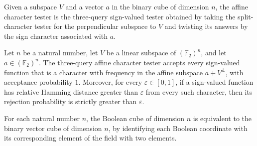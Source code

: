 \begin{definition}
\label{FABL.affineCharacterFunctionTester}
\leanok
{}
Given a subspace $V$ and a vector $a$ in the binary cube of dimension $n$, the affine
character tester is the three-query sign-valued tester obtained by taking the
split-character tester for the perpendicular subspace to $V$ and twisting its answers by
the sign character associated with $a$.
\end{definition}

\begin{theorem}
\label{FABL.affineCharacterFunctionTester_isLocalTester}
\leanok
{}
Let $n$ be a natural number, let $V$ be a linear subspace of $(\mathbb{F}_2)^n$, and let
$a\in(\mathbb{F}_2)^n$. The three-query affine character tester accepts every
sign-valued function that is a character with frequency in the affine subspace
$a+V^\perp$, with acceptance probability $1$. Moreover, for every $\varepsilon\in[0,1]$,
if a sign-valued function has relative Hamming distance greater than $\varepsilon$ from
every such character, then its rejection probability is strictly greater than
$\varepsilon$.
\end{theorem}

\begin{definition}
\label{FABL.pcppBoolCubeEquiv}
\leanok
{}
For each natural number $n$, the Boolean cube of dimension $n$ is equivalent to the
binary vector cube of dimension $n$, by identifying each Boolean coordinate with its
corresponding element of the field with two elements.
\end{definition}

